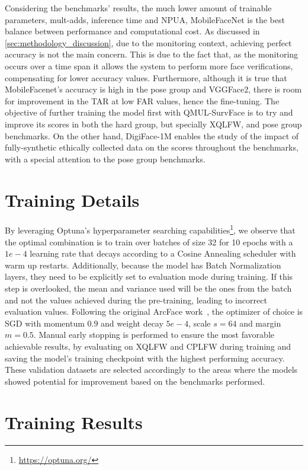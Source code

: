 \documentclass[class=report, crop=false, a4paper, 12pt]{standalone}
\begin{document}
\par Considering the benchmarks' results, the much lower amount of trainable parameters, mult-adds, inference time and NPUA, MobileFaceNet is the best balance between performance and computational cost. As discussed in \autoref{sec:methodology_discussion}, due to the monitoring context, achieving perfect accuracy is not the main concern. This is due to the fact that, as the monitoring occurs over a time span it allows the system to perform more face verifications, compensating for lower accuracy values.
Furthermore, although it is true that MobileFacenet's accuracy is high in the pose group and VGGFace2, there is room for improvement in the TAR at low FAR values, hence the fine-tuning. The objective of further training the model first with QMUL-SurvFace is to try and improve its scores in both the hard group, but specially XQLFW, and pose group benchmarks. On the other hand, DigiFace-1M enables the study of the impact of fully-synthetic ethically collected data on the scores throughout the benchmarks, with a special attention to the pose group benchmarks. 


\section{Training Details}
By leveraging Optuna's hyperparameter searching capabilities\footnote{\url{https://optuna.org/}}, we observe that the optimal combination is to train over batches of size 32 for 10 epochs with a $1e-4$ learning rate that decays according to a Cosine Annealing scheduler with warm up restarts. Additionally, because the model has Batch Normalization layers, they need to be explicitly set to evaluation mode during training. If this step is overlooked, the mean and variance used will be the ones from the batch and not the values achieved during the pre-training, leading to incorrect evaluation values. Following the original ArcFace work~\autocite{dengArcFaceAdditiveAngular}, the optimizer of choice is SGD with momentum $0.9$ and weight decay $5e-4$, scale $s=64$ and margin $m=0.5$. Manual early stopping is performed to ensure the most favorable achievable results, by evaluating on XQLFW and CPLFW during training and saving the model's training checkpoint with the highest performing accuracy. These validation datasets are selected accordingly to the areas where the models showed potential for improvement based on the benchmarks performed.

\section{Training Results}
\end{document}
